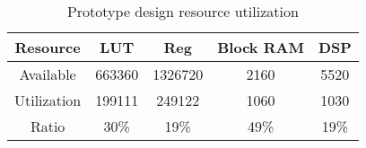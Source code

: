 \begin{table}[tb]
    \centering
    \caption{Prototype design resource utilization}
      \begin{tabular}{|c|c|c|c|c|}
      \hline
      Resource & LUT   & Reg   & Block RAM & DSP \\
      \hline
      Available & 663360 & 1326720 & 2160  & 5520 \\
      \hline
      Utilization & 199111 & 249122 & 1060   & 1030 \\
      \hline
      Ratio & 30\%  & 19\%  & 49\%  & 19\% \\
      \hline
      \end{tabular}
    \label{tab:util}
  \end{table}